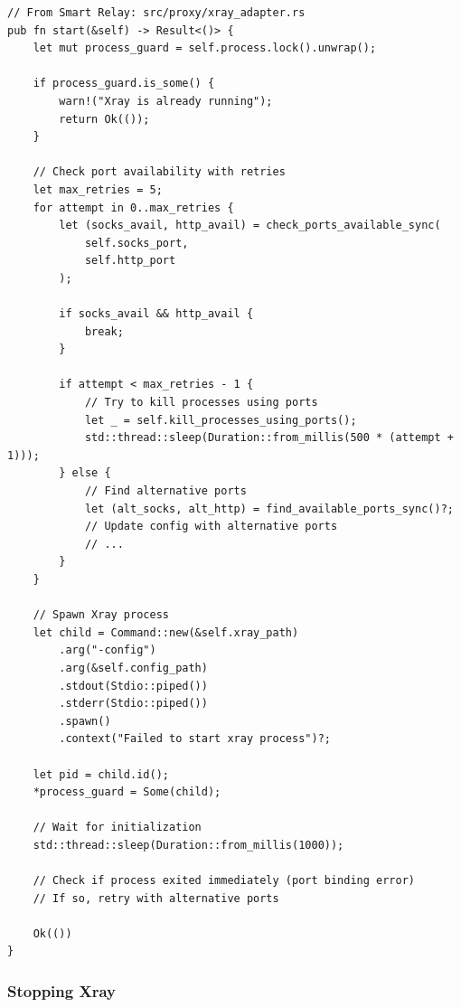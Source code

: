 \begin{verbatim}
// From Smart Relay: src/proxy/xray_adapter.rs
pub fn start(&self) -> Result<()> {
    let mut process_guard = self.process.lock().unwrap();
    
    if process_guard.is_some() {
        warn!("Xray is already running");
        return Ok(());
    }
    
    // Check port availability with retries
    let max_retries = 5;
    for attempt in 0..max_retries {
        let (socks_avail, http_avail) = check_ports_available_sync(
            self.socks_port, 
            self.http_port
        );
        
        if socks_avail && http_avail {
            break;
        }
        
        if attempt < max_retries - 1 {
            // Try to kill processes using ports
            let _ = self.kill_processes_using_ports();
            std::thread::sleep(Duration::from_millis(500 * (attempt + 1)));
        } else {
            // Find alternative ports
            let (alt_socks, alt_http) = find_available_ports_sync()?;
            // Update config with alternative ports
            // ...
        }
    }
    
    // Spawn Xray process
    let child = Command::new(&self.xray_path)
        .arg("-config")
        .arg(&self.config_path)
        .stdout(Stdio::piped())
        .stderr(Stdio::piped())
        .spawn()
        .context("Failed to start xray process")?;
    
    let pid = child.id();
    *process_guard = Some(child);
    
    // Wait for initialization
    std::thread::sleep(Duration::from_millis(1000));
    
    // Check if process exited immediately (port binding error)
    // If so, retry with alternative ports
    
    Ok(())
}
\end{verbatim}

\subsubsection{Stopping Xray}

